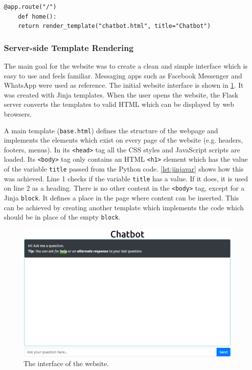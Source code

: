 \documentclass[12pt,a4paper]{article}
\newcommand{\captionstyle}[1] {
    \small{#1}
}
\begin{document}
\begin{minipage}{\columnwidth}
	\begin{lstlisting}[caption={\captionstyle{Initialisation of the home page of the front-end application.}}, label={lst:homepage}]
	@app.route("/")
	def home():
	return render_template("chatbot.html", title="Chatbot")
	\end{lstlisting}
\end{minipage}

\subsubsection{Server-side Template Rendering}
The main goal for the website was to create a clean and simple interface which is easy to use and feels familiar. Messaging apps such as Facebook Messenger and WhatsApp were used as reference. The initial website interface is shown in \cref{fig:site-interface}. It was created with Jinja templates. When the user opens the website, the Flask server converts the templates to valid HTML which can be displayed by web browsers.

A main template (\texttt{base.html}) defines the structure of the webpage and implements the elements which exist on every page of the website (e.g. headers, footers, menus). In its \texttt{<head>} tag all the CSS styles and JavaScript scripts are loaded. Its \texttt{<body>} tag only contains an HTML \texttt{<h1>} element which has the value of the variable \texttt{title} passed from the Python code. \cref{lst:jinjavar} shows how this was achieved. Line 1 checks if the variable \texttt{title} has a value. If it does, it is used on line 2 as a heading. There is no other content in the \texttt{<body>} tag, except for a Jinja \texttt{block}. It defines a place in the page where content can be inserted. This can be achieved by creating another template which implements the code which should be in place of the empty \texttt{block}.

\begin{figure}[!htb]%
    \centering
    \includegraphics[width=1.0\columnwidth]{app-interface}%
    \caption{\captionstyle{The interface of the website.}}%
    \label{fig:site-interface}%
\end{figure}
\end{document}
